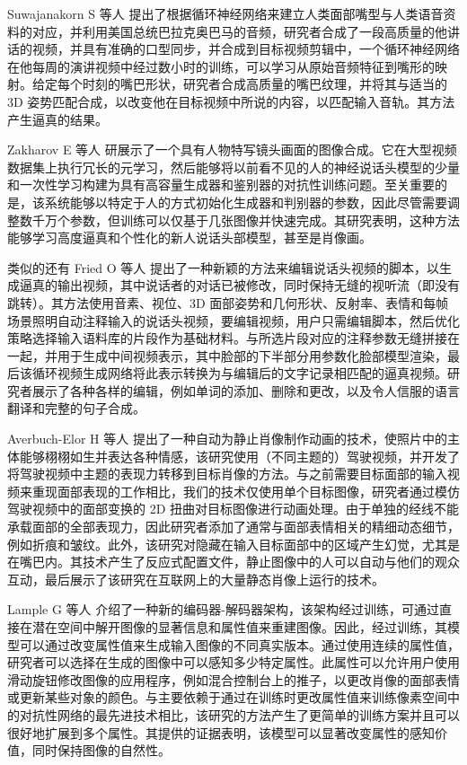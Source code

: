 Suwajanakorn S 等人 \cite{10.1145/3072959.3073640}提出了根据循环神经网络来建立人类面部嘴型与人类语音资料的对应，并利用美国总统巴拉克奥巴马的音频，研究者合成了一段高质量的他讲话的视频，并具有准确的口型同步，并合成到目标视频剪辑中，一个循环神经网络在他每周的演讲视频中经过数小时的训练，可以学习从原始音频特征到嘴形的映射。给定每个时刻的嘴巴形状，研究者合成高质量的嘴巴纹理，并将其与适当的 3D 姿势匹配合成，以改变他在目标视频中所说的内容，以匹配输入音轨。其方法产生逼真的结果。

Zakharov E 等人 \cite{Zakharov_2019_ICCV}研展示了一个具有人物特写镜头画面的图像合成。它在大型视频数据集上执行冗长的元学习，然后能够将以前看不见的人的神经说话头模型的少量和一次性学习构建为具有高容量生成器和鉴别器的对抗性训练问题。至关重要的是，该系统能够以特定于人的方式初始化生成器和判别器的参数，因此尽管需要调整数千万个参数，但训练可以仅基于几张图像并快速完成。其研究表明，这种方法能够学习高度逼真和个性化的新人说话头部模型，甚至是肖像画。

类似的还有 Fried O 等人\cite{10.1145/3306346.3323028} 提出了一种新颖的方法来编辑说话头视频的脚本，以生成逼真的输出视频，其中说话者的对话已被修改，同时保持无缝的视听流（即没有跳转）。其方法使用音素、视位、3D 面部姿势和几何形状、反射率、表情和每帧场景照明自动注释输入的说话头视频，要编辑视频，用户只需编辑脚本，然后优化策略选择输入语料库的片段作为基础材料。与所选片段对应的注释参数无缝拼接在一起，并用于生成中间视频表示，其中脸部的下半部分用参数化脸部模型渲染，最后该循环视频生成网络将此表示转换为与编辑后的文字记录相匹配的逼真视频。研究者展示了各种各样的编辑，例如单词的添加、删除和更改，以及令人信服的语言翻译和完整的句子合成。

Averbuch-Elor H 等人 \cite{10.1145/3130800.3130818}提出了一种自动为静止肖像制作动画的技术，使照片中的主体能够栩栩如生并表达各种情感，该研究使用（不同主题的）驾驶视频，并开发了将驾驶视频中主题的表现力转移到目标肖像的方法。与之前需要目标面部的输入视频来重现面部表现的工作相比，我们的技术仅使用单个目标图像，研究者通过模仿驾驶视频中的面部变换的 2D 扭曲对目标图像进行动画处理。由于单独的经线不能承载面部的全部表现力，因此研究者添加了通常与面部表情相关的精细动态细节，例如折痕和皱纹。此外，该研究对隐藏在输入目标面部中的区域产生幻觉，尤其是在嘴巴内。其技术产生了反应式配置文件，静止图像中的人可以自动与他们的观众互动，最后展示了该研究在互联网上的大量静态肖像上运行的技术。

Lample G 等人 \cite{NIPS2017_3fd60983} 介绍了一种新的编码器-解码器架构，该架构经过训练，可通过直接在潜在空间中解开图像的显著信息和属性值来重建图像。因此，经过训练，其模型可以通过改变属性值来生成输入图像的不同真实版本。通过使用连续的属性值，研究者可以选择在生成的图像中可以感知多少特定属性。此属性可以允许用户使用滑动旋钮修改图像的应用程序，例如混合控制台上的推子，以更改肖像的面部表情或更新某些对象的颜色。与主要依赖于通过在训练时更改属性值来训练像素空间中的对抗性网络的最先进技术相比，该研究的方法产生了更简单的训练方案并且可以很好地扩展到多个属性。其提供的证据表明，该模型可以显著改变属性的感知价值，同时保持图像的自然性。

